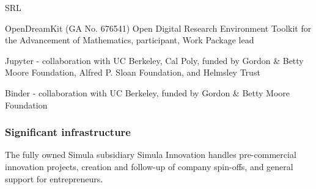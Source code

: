 \begin{sitedescription}{SRL}
\begin{compactenum}
\item OpenDreamKit (GA No. 676541) Open Digital Research Environment Toolkit for the Advancement of Mathematics, participant, Work Package lead
\item Jupyter - collaboration with UC Berkeley, Cal Poly, funded by Gordon \&
  Betty Moore Foundation, Alfred P. Sloan Foundation, and Helmsley Trust
\item Binder - collaboration with UC Berkeley, funded by Gordon \& Betty Moore
  Foundation
\end{compactenum}

\subsubsection*{Significant infrastructure}

The fully owned Simula subsidiary Simula Innovation handles pre-commercial
innovation projects, creation and follow-up of company spin-offs, and general
support for entrepreneurs.

\end{sitedescription}






